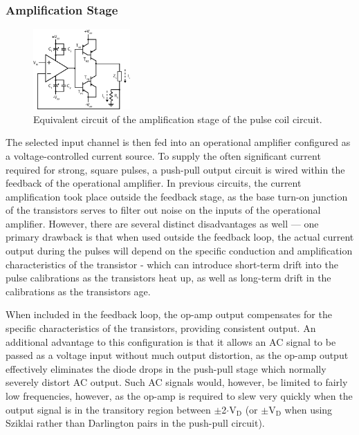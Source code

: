 \documentclass[PaulGanssle-Thesis.tex]{subfiles}
\begin{document}
\subsubsection{Amplification Stage}
\label{pulse.circuit.amplification}
\begin{figure}
\vspace*{-0.7\lineheight}
\includegraphics[width=0.33\textwidth]{figures/magnetometer/PulseCoilCircuitAmpStage.eps}
\caption{Equivalent circuit of the amplification stage of the pulse coil circuit.}
\label{fig:pulse.circuit.ampstage}
\vspace*{-0.5\lineheight}
\end{figure}The selected input channel is then fed into an operational amplifier configured as a voltage-controlled current source. To supply the often significant current required for strong, square pulses, a push-pull output circuit is wired within the feedback of the operational amplifier. In previous circuits, the current amplification took place outside the feedback stage, as the base turn-on junction of the transistors serves to filter out noise on the inputs of the operational amplifier. However, there are several distinct disadvantages as well --- one primary drawback is that when used outside the feedback loop, the actual current output during the pulses will depend on the specific conduction and amplification characteristics of the transistor - which can introduce short-term drift into the pulse calibrations as the transistors heat up, as well as long-term drift in the calibrations as the transistors age. 

When included in the feedback loop, the op-amp output compensates for the specific characteristics of the transistors, providing consistent output. An additional advantage to this configuration is that it allows an AC signal to be passed as a voltage input without much output distortion, as the op-amp output effectively eliminates the diode drops in the push-pull stage which normally severely distort AC output. Such AC signals would, however, be limited to fairly low frequencies, however, as the op-amp is required to slew very quickly when the output signal is in the transitory region between $\pm$2$\cdot$V$_\mathrm{D}$ (or $\pm$V$_\mathrm{D}$ when using Sziklai rather than Darlington pairs in the push-pull circuit).
\end{document}

